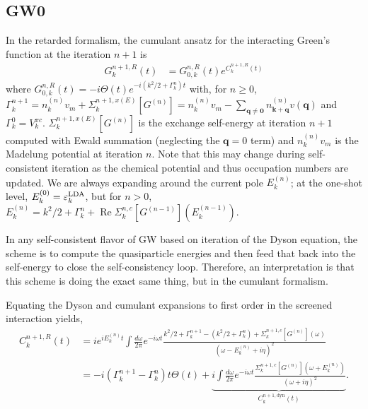 \subsection{GW0}
In the retarded formalism, the cumulant ansatz for the interacting Green's function at the iteration $n+1$ is
\begin{align} G^{n+1,R}_{k}(t) &= G_{0,k}^{n,R}(t) e^{C_{k}^{n+1,R}(t)}
\label{eq:cumulant_G}\end{align}
where $G_{0,k}^{n,R}(t) = -i \Theta(t) e^{-i \left(k^2/2 + \Gamma_k^{n}\right) t}$ with, for $n\geq0$, $\Gamma_k^{n+1} = n_{k}^{(n)}v_m+\Sigma_k^{n+1,x(E)}[G^{(n)}]=n_{k}^{(n)}v_m-\sum_{\bm{q}\neq\bm{0}} n_{\bm{k}+\bm{q}}^{(n)}v(\bm{q})$ and $\Gamma_k^{0} = V_k^{xc}$. $\Sigma_k^{n+1,x(E)}[G^{(n)}]$ is the exchange self-energy at iteration $n+1$ computed with Ewald summation (neglecting the $\bm{q}=0$ term) and $n_{k}^{(n)}v_m$ is the Madelung potential at iteration $n$. Note that this may change during self-consistent iteration as the chemical potential and thus occupation numbers are updated. We are always expanding around the current pole $E_k^{(n)}$; at the one-shot level, $E_k^{(0)} = \varepsilon_k^{\rm LDA}$, but for $n>0$, $E_k^{(n)}=k^2/2 + \Gamma_k^{n} + \operatorname{Re}\Sigma_k^{n,c}[G^{(n-1)}](E_k^{(n-1)})$.
\begin{tcolorbox}[colback=red!5!white, colframe=red!75!black, title=Intuition behind this decision ]
In any self-consistent flavor of GW based on iteration of the Dyson equation, the scheme is to compute the quasiparticle energies and then feed that back into the self-energy to close the self-consistency loop. Therefore, an interpretation is that this scheme is doing the exact same thing, but in the cumulant formalism.
\end{tcolorbox}
Equating the Dyson and
cumulant expansions to first order in the screened interaction yields,
\begin{align}
C_k^{n+1,R}(t) &= i e^{iE_k^{(n)} t}\int \frac{d\omega}{2\pi} e^{-i\omega t}
\frac{k^2/2+\Gamma_k^{n+1}-\left(k^2/2 + \Gamma_k^{n}\right) +\Sigma_k^{n+1,c}[G^{(n)}](\omega) }{(\omega - E_k^{(n)} + i\eta)^2}\\
&= -i \left(\Gamma_k^{n+1}-\Gamma_k^{n}\right) t \Theta(t) + \underbrace{i
\int \frac{d\omega}{2\pi} e^{-i\omega t}
\frac{\Sigma_k^{n+1,c}[G^{(n)}](\omega + E_k^{(n)})}{(\omega + i\eta)^2}}_{C_k^{n+1,\text{dyn}}(t)}.
\end{align}
